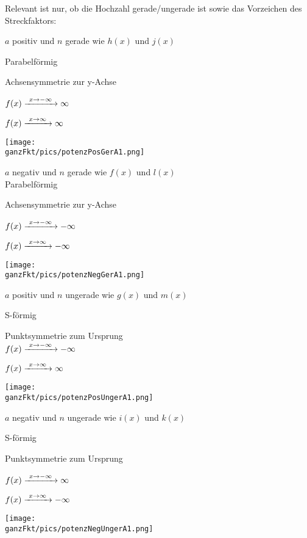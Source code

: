 \begin{Answer}[ref=potenzA1]
	
	Relevant ist nur, ob die Hochzahl gerade/ungerade ist sowie das Vorzeichen des Streckfaktors:
	
	\bigskip
	
	\begin{minipage}{\textwidth}
		\begin{minipage}{0.48\textwidth}\centering
			\(a\) positiv und \(n\) gerade wie \(h(x)\) und \(j(x)\)
			
			Parabelförmig
			
			Achsensymmetrie zur y-Achse
			
			\(f(x)\xrightarrow{\hphantom{\ }x\to-\infty\hphantom{\ }}\infty\)
			
			\(f(x)\xrightarrow{\hphantom{\ }x\to\infty\hphantom{\ }}\infty\)
			
			\texttt{[image: \\ganzFkt/pics/potenzPosGerA1.png]}
		\end{minipage}
		\begin{minipage}{0.48\textwidth}\centering
			\(a\) negativ und \(n\) gerade wie \(f(x)\) und \(l(x)\)\\
			Parabelförmig
			
			Achsensymmetrie zur y-Achse
			
			\(f(x)\xrightarrow{\hphantom{\ }x\to-\infty\hphantom{\ }}-\infty\)
			
			\(f(x)\xrightarrow{\hphantom{\ }x\to\infty\hphantom{\ }}-\infty\)
			
			\texttt{[image: \\ganzFkt/pics/potenzNegGerA1.png]}
		\end{minipage}
		
		\bigskip
		
		\begin{minipage}{0.48\textwidth}\centering
			\(a\) positiv und \(n\) ungerade wie \(g(x)\) und \(m(x)\)
			
			S-förmig
			
			Punktsymmetrie zum Ursprung\\
			\(f(x)\xrightarrow{\hphantom{\ }x\to-\infty\hphantom{\ }}-\infty\)
			
			\(f(x)\xrightarrow{\hphantom{\ }x\to\infty\hphantom{\ }}\infty\)
			
			\texttt{[image: \\ganzFkt/pics/potenzPosUngerA1.png]}
		\end{minipage}
		\begin{minipage}{0.48\textwidth}\centering
			\(a\) negativ und \(n\) ungerade wie \(i(x)\) und \(k(x)\)
			
			S-förmig
			
			Punktsymmetrie zum Ursprung
			
			\(f(x)\xrightarrow{\hphantom{\ }x\to-\infty\hphantom{\ }}\infty\)
			
			\(f(x)\xrightarrow{\hphantom{\ }x\to\infty\hphantom{\ }}-\infty\)
			
			\texttt{[image: \\ganzFkt/pics/potenzNegUngerA1.png]}
		\end{minipage}
	\end{minipage}
\end{Answer}